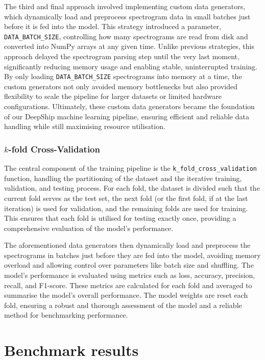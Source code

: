 The third and final approach involved implementing custom data generators, which dynamically load and preprocess spectrogram data in small batches just before it is fed into the model. This strategy introduced a parameter, \texttt{DATA\_BATCH\_SIZE}, controlling how many spectrograms are read from disk and converted into NumPy arrays at any given time. Unlike previous strategies, this approach delayed the spectrogram parsing step until the very last moment, significantly reducing memory usage and enabling stable, uninterrupted training. By only loading \texttt{DATA\_BATCH\_SIZE} spectrograms into memory at a time, the custom generators not only avoided memory bottlenecks but also provided flexibility to scale the pipeline for larger datasets or limited hardware configurations. Ultimately, these custom data generators became the foundation of our DeepShip machine learning pipeline, ensuring efficient and reliable data handling while still maximising resource utilisation. 

\subsubsection{\texorpdfstring{$k$}{k}-fold Cross-Validation}

The central component of the training pipeline is the \texttt{k\_fold\_cross\_validation} function, handling the partitioning of the dataset and the iterative training, validation, and testing process. For each fold, the dataset is divided such that the current fold serves as the test set, the next fold (or the first fold, if at the last iteration) is used for validation, and the remaining folds are used for training. This ensures that each fold is utilised for testing exactly once, providing a comprehensive evaluation of the model's performance.

The aforementioned data generators then dynamically load and preprocess the spectrograms in batches just before they are fed into the model, avoiding memory overload and allowing control over parameters like batch size and shuffling. The model's performance is evaluated using metrics such as loss, accuracy, precision, recall, and F1-score. These metrics are calculated for each fold and averaged to summarise the model's overall performance. The model weights are reset each fold, ensuring a robust and thorough assessment of the model and a reliable method for benchmarking performance.

\section{Benchmark results}

